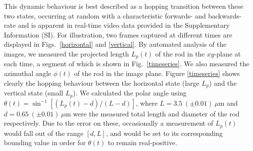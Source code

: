 \documentclass[aps,prl,twocolumn,superscriptaddress]{revtex4-1}
\begin{document}
This dynamic behaviour is best described as a hopping transition between these two states, occurring at random with a characteristic forwards- and backwards-rate and is apparent in real-time video data provided in the Supplementary Information (SI). For illustration, two frames captured at different times are displayed in Figs.\ \ref{horizontal} and \ref{vertical}. By automated analysis of the images, we measured the projected length $L_p(t)$ of the rod in the $xy$-plane at each time, a segment of which is shown in Fig.\ \ref{timeseries}. We also measured the azimuthal angle $\phi(t)$ of the rod in the image plane. Figure \ref{timeseries} shows clearly the hopping behaviour between the horizontal state (large $L_p$) and the vertical state (small $L_p$). We calculated the polar angle using $\theta(t) = \sin^{-1}{[(L_p(t)- d)/(L - d)]}$, where $L=3.5\ (\pm0.01)\ \mu$m and $d=0.65\ (\pm0.01)\ \mu$m were the measured total length and diameter of the rod respectively. Due to the error on these, occasionally a measurement of $L_p(t)$ would fall out of the range $[d, L]$, and would be set to its corresponding bounding value in order for $\theta(t)$ to remain real-positive.
\end{document}
